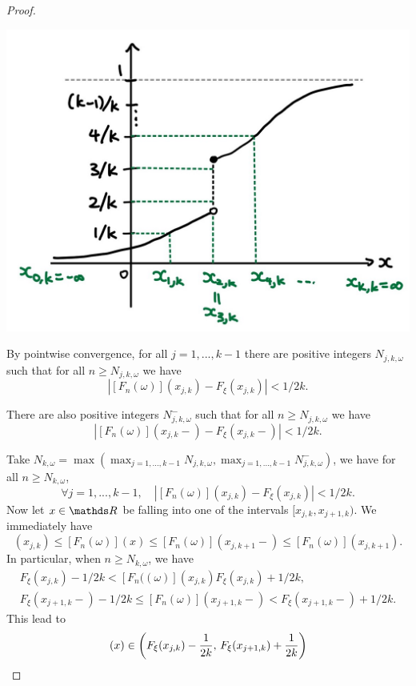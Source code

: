\begin{unexaminable}
\begin{proof}
\begin{center}
\includegraphics[scale=0.3]{figures/Fig1.2.jpg}
\end{center}
\vspace{12pt}

By pointwise convergence, for all $j=1,...,k-1$ there are positive integers $N_{j,k,\omega}$ such that for all $n \geq N_{j,k,\omega}$ we have 
\begin{equation*}
|[F_n(\omega)](x_{j,k}) - F_\xi(x_{j,k})| < 1/2k.
\end{equation*}

There are also positive integers $N^-_{j,k,\omega}$ such that for all $n \geq N_{j,k,\omega}$ we have 
\begin{equation*}
|[F_n(\omega)](x_{j,k}-) - F_\xi(x_{j,k}-)| < 1/2k.
\end{equation*}

Take $N_{k,\omega} = \max{(\max_{j=1,...,k-1} N_{j,k,\omega}, \max_{j=1,...,k-1} N^-_{j,k,\omega})}$, we have for all $n \geq N_{k,\omega}$,
\begin{equation*}
\forall j = 1,...,k-1, \quad |[F_n(\omega)](x_{j,k}) - F_\xi(x_{j,k})| < 1/2k.
\end{equation*}
Now let $x \in \R$ be falling into one of the intervals $[x_{j,k}, x_{j+1,k})$. We immediately have
\begin{equation*}
    [F_n(\omega)](x_{j,k}) \leq [F_n(\omega)](x) \leq [F_n(\omega)](x_{j,k+1}-) \leq [F_n(\omega)](x_{j,k+1}).
\end{equation*}
In particular, when $n \geq N_{k,\omega}$, we have
\begin{gather*}
    F_\xi(x_{j,k})-1/2k < [F_n((\omega)](x_{j,k}) F_\xi(x_{j,k})+1/2k, \\
    F_\xi(x_{j+1,k}-)-1/2k \leq [F_n(\omega)](x_{j+1,k}-) < F_\xi(x_{j+1,k}-)+1/2k.
\end{gather*}
This lead to 
\begin{equation*}
[F_n(\omega)](x) \in \bracket{F_\xi(x_{j,k})-\frac{1}{2k}, \,  F_\xi(x_{j+1,k})+\frac{1}{2k}}
\end{equation*}
\newpage


\end{proof}
\end{unexaminable}
